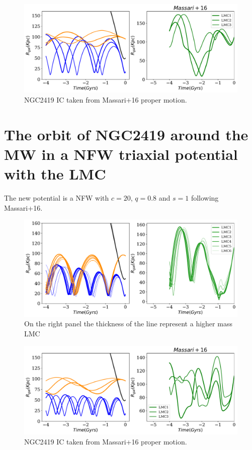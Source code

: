 \documentclass[14pt]{article}
\begin{document}
\begin{figure}[H]
\centering
\includegraphics[scale=0.5]{../exploratory_code/gal_orbits_all_LMCs_massari.pdf}
\caption{NGC2419 IC taken from Massari+16 proper motion.}
\end{figure}

\section{The orbit of NGC2419 around the MW in a NFW triaxial
potential with the LMC}


The new potential is a NFW with $c=20$, $q=0.8$ and $s=1$ following
Massari+16.

\begin{figure}[H]
\centering
\includegraphics[scale=0.5]{../exploratory_code/gal_orbits_all_LMCs_Triaxial.pdf}
On the right panel the thickness of the line represent a higher mass
LMC
\end{figure}

\begin{figure}[H]
\centering
\includegraphics[scale=0.5]{../exploratory_code/gal_orbits_all_LMCs_massari_T.pdf}
\caption{NGC2419 IC taken from Massari+16 proper motion.}
\end{figure}
\end{document}
